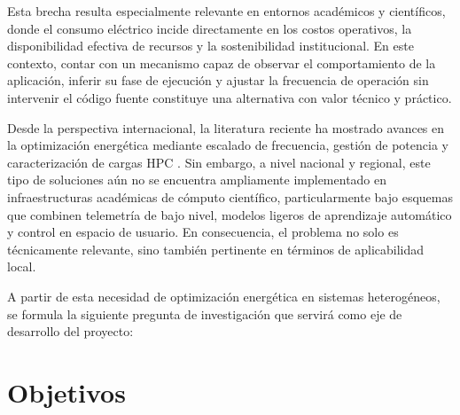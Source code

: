 \documentclass[12pt,oneside,spanish]{book}
\begin{document}
Esta brecha resulta especialmente relevante en entornos académicos y científicos, donde el consumo eléctrico incide directamente en los costos operativos, la disponibilidad efectiva de recursos y la sostenibilidad institucional. En este contexto, contar con un mecanismo capaz de observar el comportamiento de la aplicación, inferir su fase de ejecución y ajustar la frecuencia de operación sin intervenir el código fuente constituye una alternativa con valor técnico y práctico.

Desde la perspectiva internacional, la literatura reciente ha mostrado avances en la optimización energética mediante escalado de frecuencia, gestión de potencia y caracterización de cargas HPC \cite{Simsek2024,Costa2025,Antici2024,Calore2017,Ali2023}. Sin embargo, a nivel nacional y regional, este tipo de soluciones aún no se encuentra ampliamente implementado en infraestructuras académicas de cómputo científico, particularmente bajo esquemas que combinen telemetría de bajo nivel, modelos ligeros de aprendizaje automático y control en espacio de usuario. En consecuencia, el problema no solo es técnicamente relevante, sino también pertinente en términos de aplicabilidad local.

A partir de esta necesidad de optimización energética en sistemas heterogéneos, se formula la siguiente pregunta de investigación que servirá como eje de desarrollo del proyecto:

\vspace{0.5cm}

\noindent{}

\vspace{0.5cm}


\section*{Objetivos}
\end{document}

